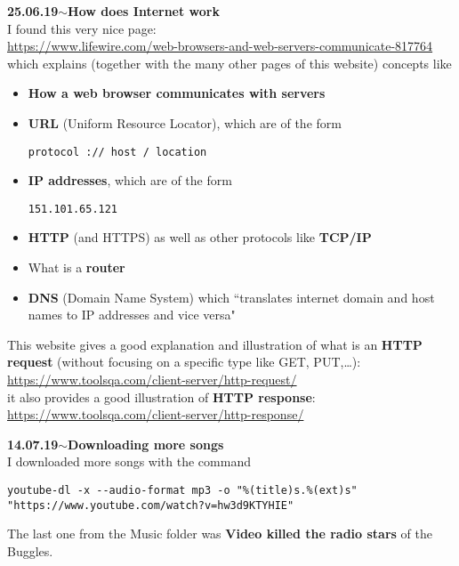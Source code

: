 \documentclass[11pt,a4paper]{article}
\newenvironment{loggentry}[2]%
{\noindent\textbf{#1}\hspace{1cm}$\mathbf{\sim}$\text{ }\textbf{#2}\\}{\vspace{0.5cm}}
\begin{document}
\begin{loggentry}{25.06.19}{How does Internet work}

I found this very nice page:\\
\url{https://www.lifewire.com/web-browsers-and-web-servers-communicate-817764}\\
which explains (together with the many other pages of this website) concepts like
\begin{itemize}
\item \textbf{How a web browser communicates with servers}
\item \textbf{URL} (Uniform Resource Locator), which are of the form
\begin{verbatim}
protocol :// host / location
\end{verbatim}
\item \textbf{IP addresses}, which are of the form
\begin{verbatim}
151.101.65.121
\end{verbatim}
\item \textbf{HTTP} (and HTTPS) as well as other protocols like \textbf{TCP/IP}
\item What is a \textbf{router}
\item \textbf{DNS} (Domain Name System) which ``translates internet domain and host names to IP addresses and vice versa"
\end{itemize}
This website gives a good explanation and illustration of what is an \textbf{HTTP request} (without focusing on a specific type like GET, PUT,\dots):\\
\url{https://www.toolsqa.com/client-server/http-request/}\\
it also provides a good illustration of \textbf{HTTP response}:\\
\url{https://www.toolsqa.com/client-server/http-response/}\\

\end{loggentry}

\begin{loggentry}{14.07.19}{Downloading more songs}
I downloaded more songs with the command
\begin{verbatim}
youtube-dl -x --audio-format mp3 -o "%(title)s.%(ext)s" "https://www.youtube.com/watch?v=hw3d9KTYHIE"
\end{verbatim}
The last one from the Music folder was \textbf{Video killed the radio stars} of the Buggles. 
\end{loggentry}
\end{document}
